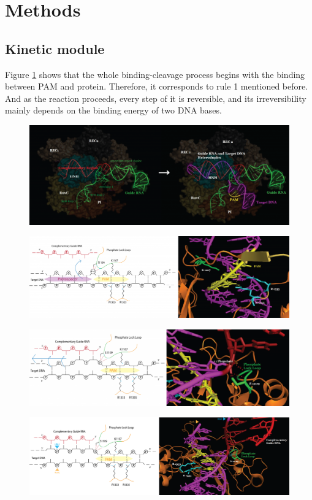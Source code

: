 \section{Methods}
\subsection{Kinetic module}
Figure \ref{fig:2} shows that the whole binding-cleavage process begins with the binding between PAM and protein. Therefore, it corresponds to rule 1 mentioned before. And as the reaction proceeds, every step of it is reversible, and its irreversibility mainly depends on the binding energy of two DNA bases.
\begin{figure}
\centering
\includegraphics[width=0.7\linewidth]{2}
\caption{}
\label{fig:2}
\end{figure}

\begin{figure}
\centering
\includegraphics[width=0.7\linewidth]{3}
\caption{}
\label{fig:3}
\end{figure}

\begin{figure}
\centering
\includegraphics[width=0.7\linewidth]{4}
\caption{}
\label{fig:4}
\end{figure}

\begin{figure}
\centering
\includegraphics[width=0.7\linewidth]{5}
\caption{}
\label{fig:5}
\end{figure}
	
